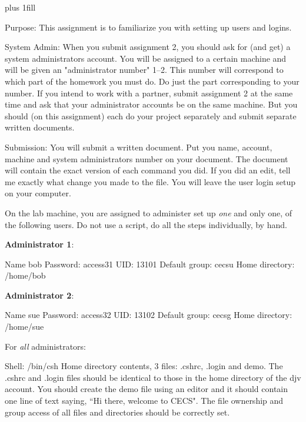 
\rightskip=0pt plus 1fill

\parindent 0pt

Purpose: This assignment is to familiarize you with setting up users and logins.

System Admin: When you submit assignment 2, you should ask for (and get)
a system administrators account.
You will be assigned to a certain machine and will be given an
"administrator number" 1--2.
This number will correspond to which part of the homework you must do.
Do just the part corresponding to your number.
If you intend to work with a partner, submit assignment 2 at the
same time and ask that your administrator accounts be on the same
machine.
But you should (on this assignment) each do your project separately
and submit separate written documents.

Submission: You will submit a written document.
Put you name, account, machine and system administrators number on your 
document.
The document will contain the exact version of each command you did.
If you did an edit, tell me exactly what change you made to the file. 
You will leave the user login setup on your computer.

On the lab machine, you are assigned to administer set up {\it one}
and only one, of the following users.
Do not use a script, do all the steps individually, by hand.

{\bf Administrator 1}:

Name {\ltt{}bob}
\break
Password: access31
\break
UID: {\ltt{}13101}
\break
Default group: {\ltt{}cecsu}
\break
Home directory: {\ltt{}/home/bob}

{\bf Administrator 2}:

Name {\ltt{}sue}
\break
Password: access32
\break
UID: {\ltt{}13102}
\break
Default group: {\ltt{}cecsg}
\break
Home directory: {\ltt{}/home/sue}

For {\it all} administrators:

Shell: {\ltt{}/bin/csh}
\break
Home directory contents, 3 files:
{\ltt{}.cshrc}, {\ltt{}.login} and {\ltt{}demo}.
\break
The {\ltt{}.cshrc} and {\ltt{}.login} files should be identical to those in
the home directory of the {\ltt{}djv} account.
You should create the {\ltt{}demo} file using an editor
and it should contain one line of text saying,
``Hi there, welcome to CECS".
The file ownership and group access of all files and directories
should be correctly set.
\bye
